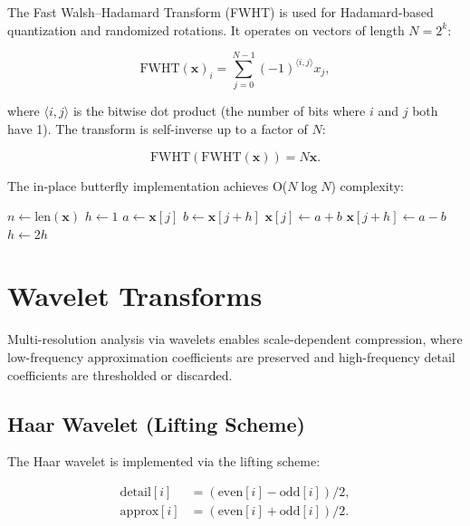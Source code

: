 \documentclass[11pt,a4paper,openright]{book}
\begin{document}
The Fast Walsh--Hadamard Transform (FWHT) is used for Hadamard-based quantization and randomized rotations. It operates on vectors of length $N = 2^k$:

\begin{equation}
	\label{eq:fwht}
	\text{FWHT}(\mathbf{x})_i = \sum_{j=0}^{N-1} (-1)^{\langle i, j \rangle} x_j,
\end{equation}

where $\langle i, j \rangle$ is the bitwise dot product (the number of bits where $i$ and $j$ both have 1). The transform is self-inverse up to a factor of $N$:

\begin{equation}
	\label{eq:fwht_inverse}
	\text{FWHT}(\text{FWHT}(\mathbf{x})) = N \mathbf{x}.
\end{equation}

The in-place butterfly implementation achieves O($N \log N$) complexity:

\begin{algorithm}[H]
	\caption{FWHT butterfly (in-place)}
	\begin{algorithmic}[1]
		\State $n \gets \text{len}(\mathbf{x})$
		\State $h \gets 1$
		\State $a \gets \mathbf{x}[j]$
		\State $b \gets \mathbf{x}[j+h]$
		\State $\mathbf{x}[j] \gets a + b$
		\State $\mathbf{x}[j+h] \gets a - b$
		\EndFor
		\EndFor
		\State $h \gets 2h$
		\EndWhile
		\EndProcedure
	\end{algorithmic}
\end{algorithm}

\section{Wavelet Transforms}

Multi-resolution analysis via wavelets enables scale-dependent compression, where low-frequency approximation coefficients are preserved and high-frequency detail coefficients are thresholded or discarded.

\subsection{Haar Wavelet (Lifting Scheme)}

The Haar wavelet is implemented via the lifting scheme:

\begin{align}
	\text{detail}[i] & = (\text{even}[i] - \text{odd}[i]) / 2, \\
	\text{approx}[i] & = (\text{even}[i] + \text{odd}[i]) / 2.
\end{align}
\end{document}
